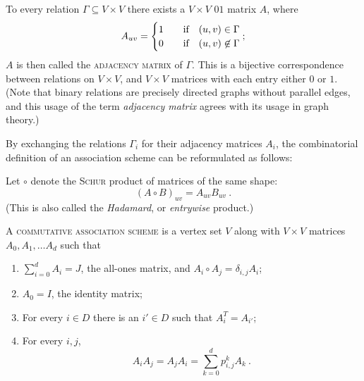 \documentclass{report}
\begin{document}
    To every relation $\Gamma \subseteq V \times V$ there exists a $V \times V$ $01$
    matrix $A$, where
    \begin{equation}\label{adjacency-matrix}
      A_{uv} = \begin{cases}
        1 & \quad\text{if}\quad (u, v) \in \Gamma \\
        0 & \quad\text{if}\quad (u, v) \not\in \Gamma \\
      \end{cases};
    \end{equation}
    $A$ is then called the \textsc{adjacency matrix} of $\Gamma$.
    This is a bijective correspondence between relations on $V \times V$,
    and $V \times V$ matrices with each entry either $0$ or $1$.
    (Note that binary relations are precisely directed graphs without parallel
    edges, and this usage of the term \textit{adjacency matrix} agrees with its
    usage in graph theory.)

    By exchanging the relations $\Gamma_i$ for their adjacency matrices $A_i$, the
    combinatorial definition of an association scheme can be reformulated as
    follows:

    \begin{defn}
      \label{association-scheme-alg}
      Let $\circ$ denote the \textsc{Schur} product of matrices of the same shape:
      \begin{equation}\label{schur-prod}
        (A \circ B)_{uv} = A_{uv} B_{uv}
        \ .
      \end{equation}
      (This is also called the \textit{Hadamard}, or \textit{entrywise} product.)

      A \textsc{commutative association scheme} is a vertex set $V$ along with
      $V \times V$ matrices $A_0, A_1, \ldots A_d$ such that
      \begin{enumerate}
        \item $\displaystyle \sum_{i=0}^d A_i = J$, the all-ones matrix,
          and $A_i \circ A_j = \delta_{i, j} A_i$;
          \label{aAS-part}
        \item $A_0 = I$, the identity matrix;
          \label{aAS-diag}
        \item For every $i \in D$ there is an $i' \in D$ such that $A_i^T =
          A_{i'}$;
          \label{aAS-sym}
        \item For every $i, j$,
          $$
            A_i A_j = A_j A_i = \sum_{k = 0}^d p_{i, j}^k A_k
            \ .
          $$
          \label{aAS-reg}
      \end{enumerate}
    \end{defn}
\end{document}
